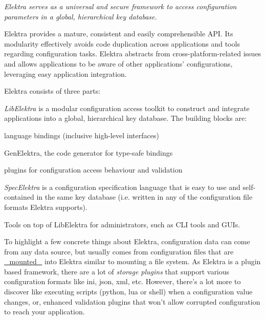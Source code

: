 {\itshape Elektra serves as a universal and secure framework to access configuration parameters in a global, hierarchical key database.}



Elektra provides a mature, consistent and easily comprehensible A\+P\+I. Its modularity effectively avoids code duplication across applications and tools regarding configuration tasks. Elektra abstracts from cross-\/platform-\/related issues and allows applications to be aware of other applications' configurations, leveraging easy application integration.

Elektra consists of three parts\+:


\begin{DoxyEnumerate}
\item {\itshape Lib\+Elektra} is a modular configuration access toolkit to construct and integrate applications into a global, hierarchical key database. The building blocks are\+:
\begin{DoxyItemize}
\item language bindings (inclusive high-\/level interfaces)
\item Gen\+Elektra, the code generator for type-\/safe bindings
\item plugins for configuration access behaviour and validation
\end{DoxyItemize}
\item {\itshape Spec\+Elektra} is a configuration specification language that is easy to use and self-\/contained in the same key database (i.\+e. written in any of the configuration file formats Elektra supports).
\item Tools on top of Lib\+Elektra for administrators, such as C\+L\+I tools and G\+U\+Is.
\end{DoxyEnumerate}

To highlight a few concrete things about Elektra, configuration data can come from any data source, but usually comes from configuration files that are \hyperlink{md_doc_help_elektra-mounting_doc_help_elektra-mounting_md}{\+\_\+mounted\+\_\+} into Elektra similar to mounting a file system. As Elektra is a plugin based framework, there are a lot of {\itshape storage plugins} that support various configuration formats like ini, json, xml, etc. However, there's a lot more to discover like executing scripts ({\ttfamily python}, {\ttfamily lua} or {\ttfamily shell}) when a configuration value changes, or, enhanced validation plugins that won't allow corrupted configuration to reach your application.

